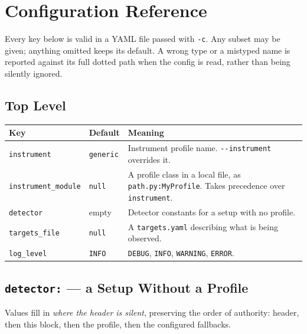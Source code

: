 \documentclass[11pt,a4paper]{article}
\begin{document}
\section{Configuration Reference}
Every key below is valid in a YAML file passed with \texttt{-c}. Any subset may
be given; anything omitted keeps its default. A wrong type or a mistyped name is
reported against its full dotted path when the config is read, rather than being
silently ignored.

\subsection{Top Level}
\begin{center}
\begin{tabularx}{\textwidth}{|l|l|X|}
\hline
\textbf{Key} & \textbf{Default} & \textbf{Meaning} \\
\hline
\texttt{instrument} & \texttt{generic} & Instrument profile name. \texttt{-{}-instrument} overrides it. \\
\hline
\texttt{instrument\_module} & \texttt{null} & A profile class in a local file, as \texttt{path.py:MyProfile}. Takes precedence over \texttt{instrument}. \\
\hline
\texttt{detector} & empty & Detector constants for a setup with no profile. \\
\hline
\texttt{targets\_file} & \texttt{null} & A \texttt{targets.yaml} describing what is being observed. \\
\hline
\texttt{log\_level} & \texttt{INFO} & \texttt{DEBUG}, \texttt{INFO}, \texttt{WARNING}, \texttt{ERROR}. \\
\hline
\end{tabularx}
\end{center}

\subsection{\texttt{detector:} --- a Setup Without a Profile}
Values fill in \emph{where the header is silent}, preserving the order of
authority: header, then this block, then the profile, then the configured
fallbacks.
\end{document}
